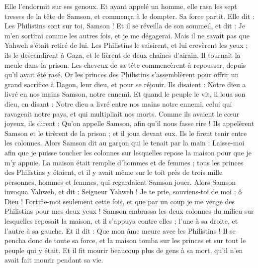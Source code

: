 \begin{multicols}{2}
Elle l'endormit sur ses genoux. Et ayant appelé un homme, elle rasa les sept tresses de la tête de Samson, et commença à le dompter. Sa force partit.
Elle dit : Les Philistins sont sur toi, Samson ! Et il se réveilla de son sommeil, et dit : Je m'en sortirai comme les autres fois, et je me dégagerai. Mais il ne savait pas que Yahweh s'était retiré de lui.
Les Philistins le saisirent, et lui crevèrent les yeux ; ils le descendirent à Gaza, et le lièrent de deux chaînes d'airain. Il tournait la meule dans la prison.
Les cheveux de sa tête commencèrent à repousser, depuis qu'il avait été rasé.
Or les princes des Philistins s'assemblèrent pour offrir un grand sacrifice à Dagon, leur dieu, et pour se réjouir. Ils disaient : Notre dieu a livré en nos mains Samson, notre ennemi.
Et quand le peuple le vit, il loua son dieu, en disant : Notre dieu a livré entre nos mains notre ennemi, celui qui ravageait notre pays, et qui multipliait nos morts.
Comme ils avaient le cœur joyeux, ils dirent : Qu'on appelle  Samson, afin qu'il nous fasse rire ! Ils appelèrent Samson et le tirèrent de la prison ; et il joua devant eux. Ils le firent tenir entre les colonnes.
Alors Samson dit au garçon qui le tenait par la main : Laisse-moi afin que je puisse toucher les colonnes sur lesquelles repose la maison pour que je m'y appuie.
La maison était remplie d'hommes et de femmes ; tous les princes des Philistins y étaient, et il y avait même sur le toit près de trois mille personnes, hommes et femmes, qui regardaient Samson jouer.
Alors Samson invoqua Yahweh, et dit : Seigneur Yahweh ! Je te prie, souviens-toi de moi ; ô Dieu ! Fortifie-moi seulement cette fois, et que par un coup je me venge des Philistins pour mes deux yeux !
Samson embrassa les deux colonnes du milieu sur lesquelles reposait la maison, et il s'appuya contre elles ; l'une à sa droite, et l'autre à sa gauche.
Et il dit : Que mon âme meure avec les Philistins ! Il se pencha donc de toute sa force, et la maison tomba sur les princes et sur tout le peuple qui y était. Et il fit mourir beaucoup plus de gens à sa mort, qu'il n'en avait fait mourir pendant sa vie.

\end{multicols}
